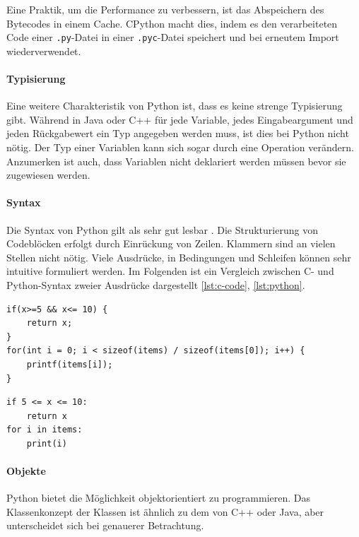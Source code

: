 		Eine Praktik, um die Performance zu verbessern, ist das Abspeichern des Bytecodes in einem Cache. CPython macht dies, indem es den verarbeiteten Code einer \lstinline|.py|-Datei in einer \lstinline|.pyc|-Datei speichert und bei erneutem Import wiederverwendet. \cite[vgl.][]{waraw2009bytecode}
		
		\paragraph{Typisierung} Eine weitere Charakteristik von Python ist, dass es keine strenge Typisierung gibt. Während in Java oder C++ für jede Variable, jedes Eingabeargument und jeden Rückgabewert ein Typ angegeben werden muss, ist dies bei Python nicht nötig. Der Typ einer Variablen kann sich sogar durch eine Operation verändern. Anzumerken ist auch, dass Variablen nicht deklariert werden müssen bevor sie zugewiesen werden.
			
		\paragraph{Syntax} Die Syntax von Python gilt als sehr gut lesbar \cite[vgl.][]{bassi2007primer}. Die Strukturierung von Codeblöcken erfolgt durch Einrückung von Zeilen. Klammern sind an vielen Stellen nicht nötig. Viele Ausdrücke, in Bedingungen und Schleifen können sehr intuitive formuliert werden. 
		Im Folgenden ist ein Vergleich zwischen C- und Python-Syntax zweier Ausdrücke dargestellt \ref{lst:c-code}, \ref{lst:python}.
	
\begin{lstlisting}[caption=Beispiel Code in C, label=lst:c-code]
if(x>=5 && x<= 10) {
	return x;
}
for(int i = 0; i < sizeof(items) / sizeof(items[0]); i++) {
	printf(items[i]);
}
\end{lstlisting}
	
\begin{lstlisting}[caption=Beispiel Code in Python, label=lst:python]
if 5 <= x <= 10:
	return x
for i in items:
	print(i)
\end{lstlisting}		
				
		
		\paragraph{Objekte} Python bietet die Möglichkeit objektorientiert zu programmieren. Das Klassenkonzept der Klassen ist ähnlich zu dem von C++ oder Java, aber unterscheidet sich bei genauerer Betrachtung.
		
